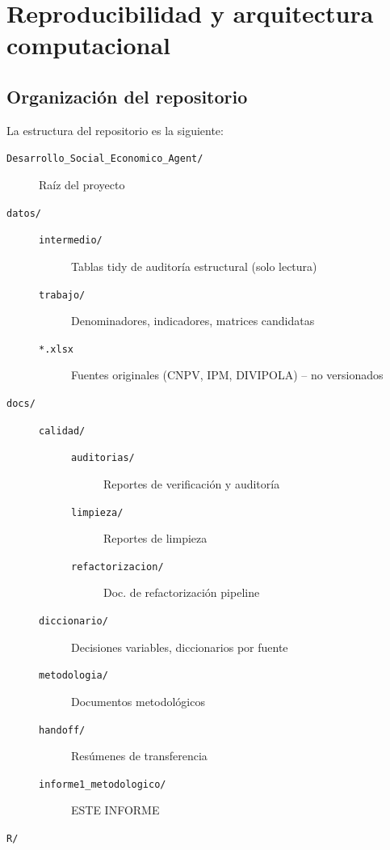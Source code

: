\section{Reproducibilidad y arquitectura computacional}
\label{ch:reproducibilidad}

\subsection{Organización del repositorio}
\label{sec:organizacion_repo}

La estructura del repositorio es la siguiente:

\begin{description}
    \item[\texttt{Desarrollo\_Social\_Economico\_Agent/}] Raíz del proyecto
    \item[\texttt{datos/}]
    \begin{description}
        \item[\texttt{intermedio/}] Tablas tidy de auditoría estructural (solo lectura)
        \item[\texttt{trabajo/}] Denominadores, indicadores, matrices candidatas
        \item[\texttt{*.xlsx}] Fuentes originales (CNPV, IPM, DIVIPOLA) -- no versionados
    \end{description}
    \item[\texttt{docs/}]
    \begin{description}
        \item[\texttt{calidad/}]
        \begin{description}
            \item[\texttt{auditorias/}] Reportes de verificación y auditoría
            \item[\texttt{limpieza/}] Reportes de limpieza
            \item[\texttt{refactorizacion/}] Doc. de refactorización pipeline
        \end{description}
        \item[\texttt{diccionario/}] Decisiones variables, diccionarios por fuente
        \item[\texttt{metodologia/}] Documentos metodológicos
        \item[\texttt{handoff/}] Resúmenes de transferencia
        \item[\texttt{informe1\_metodologico/}] ESTE INFORME
    \end{description}
    \item[\texttt{R/}]

\end{description}

